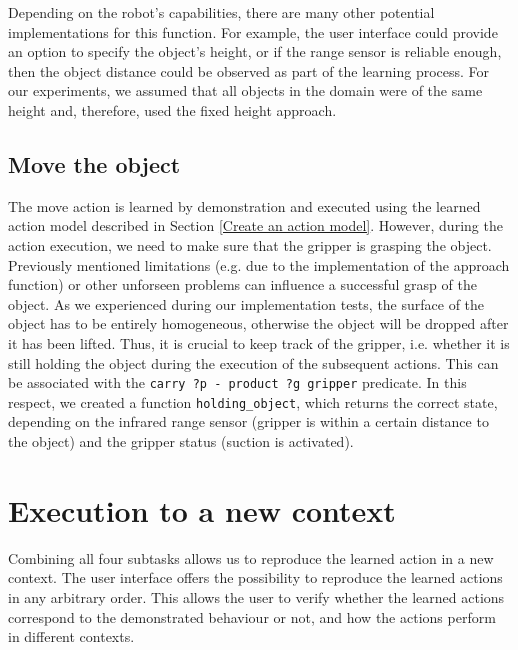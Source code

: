 Depending on the robot's capabilities, there are many other potential implementations for this function. For example, the user interface could provide an option to specify the object's height, or if the range sensor is reliable enough, then the object distance could be observed as part of the learning process. For our experiments, we assumed that all objects in the domain were of the same height and, therefore, used the fixed height approach.


\subsection{Move the object}\label{holdingObject}
The move action is learned by demonstration and executed using the learned action model described in Section \ref{Create an action model}. However, during the action execution, we need to make sure that the gripper is grasping the object. Previously mentioned limitations (e.g. due to the implementation of the approach function) or other unforseen problems can influence a successful grasp of the object. As we experienced during our implementation tests, the surface of the object has to be entirely homogeneous, otherwise the object will be dropped after it has been lifted. Thus, it is crucial to keep track of the gripper, i.e. whether it is still holding the object during the execution of the subsequent actions. This can be associated with the \texttt{carry ?p - product ?g gripper} predicate. In this respect, we created a function \texttt{holding_object}, which returns the correct state, depending on the infrared range sensor (gripper is within a certain distance to the object) and the gripper status (suction is activated).

\section{Execution to a new context}
Combining all four subtasks allows us to reproduce the learned action in a new context. The user interface offers the possibility to reproduce the learned actions in any arbitrary order. This allows the user to verify whether the learned actions correspond to the demonstrated behaviour or not, and how the actions perform in different contexts.

